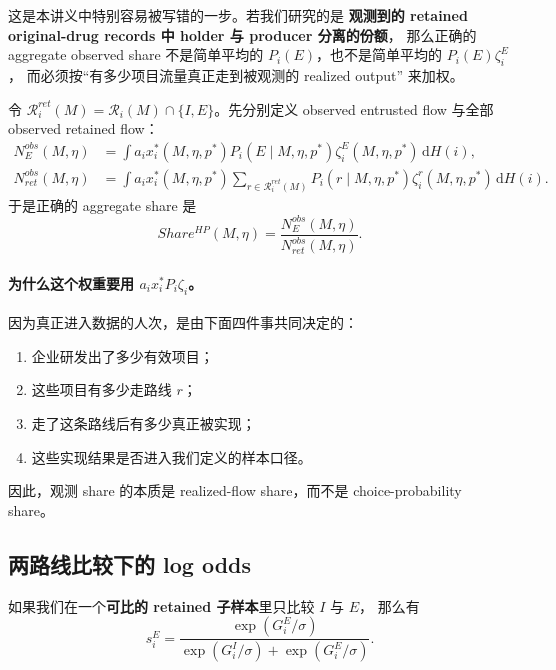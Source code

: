 \documentclass[12pt,UTF8]{ctexart}
\newcommand{\dd}{\,\mathrm{d}}
\newcommand{\Rset}{\mathcal{R}}
\theoremstyle{plain}
\theoremstyle{remark}
\begin{document}
这是本讲义中特别容易被写错的一步。若我们研究的是
\textbf{观测到的 retained original-drug records 中 holder 与 producer 分离的份额}，
那么正确的 aggregate observed share 不是简单平均的
$P_i(E)$，也不是简单平均的 $P_i(E)\zeta_i^E$，
而必须按“有多少项目流量真正走到被观测的 realized output”
来加权。

令 $\Rset_i^{ret}(M)=\Rset_i(M)\cap\{I,E\}$。先分别定义 observed entrusted
flow 与全部 observed retained flow：
\begin{align}
N_E^{obs}(M,\eta)
&=
\int a_i x_i^*(M,\eta,p^*)P_i(E\mid M,\eta,p^*)
\zeta_i^E(M,\eta,p^*)\dd H(i),
\label{eq:observed_e_flow}\\
N_{ret}^{obs}(M,\eta)
&=
\int a_i x_i^*(M,\eta,p^*)
\sum_{r\in\Rset_i^{ret}(M)}
P_i(r\mid M,\eta,p^*)\zeta_i^r(M,\eta,p^*)\dd H(i).
\label{eq:observed_retained_flow}
\end{align}
于是正确的 aggregate share 是
\begin{equation}
Share^{HP}(M,\eta)
=
\frac{N_E^{obs}(M,\eta)}{N_{ret}^{obs}(M,\eta)}.
\label{eq:aggregate_share}
\end{equation}

\paragraph{为什么这个权重要用 $a_i x_i^*P_i\zeta_i$。}
因为真正进入数据的人次，是由下面四件事共同决定的：

\begin{enumerate}[leftmargin=2em]
    \item 企业研发出了多少有效项目；
    \item 这些项目有多少走路线 $r$；
    \item 走了这条路线后有多少真正被实现；
    \item 这些实现结果是否进入我们定义的样本口径。
\end{enumerate}

因此，观测 share 的本质是 realized-flow share，而不是 choice-probability
share。

\subsection{两路线比较下的 log odds}

如果我们在一个\textbf{可比的 retained 子样本}里只比较 $I$ 与 $E$，
那么有
\begin{equation}
s_i^E
=
\frac{\exp(G_i^E/\sigma)}
{\exp(G_i^I/\sigma)+\exp(G_i^E/\sigma)}.
\label{eq:two_route_share}
\end{equation}
\end{document}
